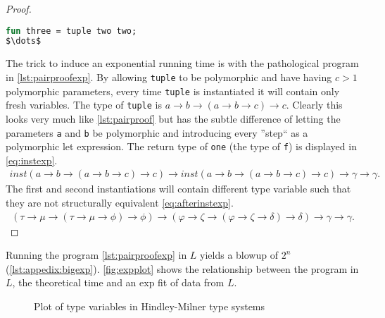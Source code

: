 \documentclass[11pt,oneside,a4paper]{report}
\begin{document}
\begin{proof}
\begin{lstlisting}[language=ML,caption={Nested pairs with different type variables},label={lst:pairproofexp},mathescape=true]
fun three = tuple two two;
$\dots$
\end{lstlisting}
    The trick to induce an exponential running time is with the pathological program in \autoref{lst:pairproofexp}.
    By allowing \texttt{tuple} to be polymorphic and have having $c > 1$ polymorphic parameters, every time \texttt{tuple} is instantiated it will contain only fresh variables.
    The type of \texttt{tuple} is $a \rightarrow b \rightarrow (a \rightarrow b \rightarrow c) \rightarrow c$.
    Clearly this looks very much like \autoref{lst:pairproof} but has the subtle difference of letting the parameters \texttt{a} and \texttt{b} be polymorphic and introducing every ''step`` as a polymorphic let expression.
    The return type of \texttt{one} (the type of \texttt{f}) is displayed in \autoref{eq:instexp}.
    \begin{align}
        \textit{inst}(a \rightarrow b \rightarrow (a \rightarrow b \rightarrow c) \rightarrow c) \rightarrow \textit{inst}(a \rightarrow b \rightarrow (a \rightarrow b \rightarrow c) \rightarrow c) \rightarrow \gamma \rightarrow \gamma.
        \label{eq:instexp}
    \end{align}
    The first and second instantiations will contain different type variable such that they are not structurally equivalent \autoref{eq:afterinstexp}.
    \begin{align}
        (\tau \rightarrow \mu \rightarrow (\tau \rightarrow \mu \rightarrow \phi) \rightarrow \phi) \rightarrow (\varphi \rightarrow \zeta \rightarrow (\varphi \rightarrow \zeta \rightarrow \delta) \rightarrow \delta) \rightarrow \gamma \rightarrow \gamma.
        \label{eq:afterinstexp}
    \end{align}
\end{proof}
Running the program \autoref{lst:pairproofexp} in $L$ yields a blowup of $2^n$ (\autoref{lst:appedix:bigexp}).
\autoref{fig:expplot} shows the relationship between the program in $L$, the theoretical time and an exp fit of data from $L$.
\begin{figure}[ht]
    \centering
{}
    \caption{Plot of type variables in Hindley-Milner type systems}
    \label{fig:expplot}
\end{figure}
\end{document}
